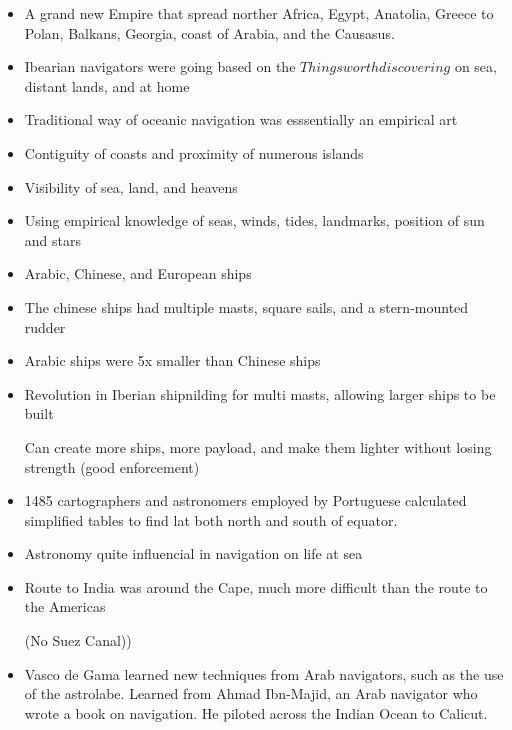 \documentclass{article}
\begin{document}
\begin{itemize}
  \item A grand new Empire that spread norther Africa, Egypt, Anatolia, Greece to Polan, Balkans, Georgia,
    coast of Arabia,
    and the Causasus.
  \item Ibearian navigators were going based on the $Things worth discovering$
    on sea, distant lands, and at home
  \item Traditional way of oceanic navigation was esssentially an empirical art
  \item Contiguity of coasts and proximity of numerous islands
  \item Visibility of sea, land, and heavens
  \item Using empirical knowledge of seas, winds, tides, landmarks, position of sun and stars
  \item Arabic, Chinese, and European ships
  \item The chinese ships had multiple masts, square sails, and a stern-mounted rudder
  \item Arabic ships were 5x smaller than Chinese ships
  \item Revolution in Iberian shipnilding for multi masts, allowing larger ships to be built

    Can create more ships, more payload, and make them lighter without losing strength (good enforcement)
  \item 1485 cartographers and astronomers employed by Portuguese calculated simplified tables
    to find lat both north and south of equator.
  \item Astronomy quite influencial in navigation on life at sea
  \item Route to India was around the Cape, much more difficult than the route to the Americas

    (No Suez Canal))
  \item Vasco de Gama learned new techniques from Arab navigators, such as the use of the astrolabe.
    Learned from Ahmad Ibn-Majid, an Arab navigator who wrote a book on navigation. He piloted
    across the Indian Ocean to Calicut.


\end{itemize}
\end{document}
